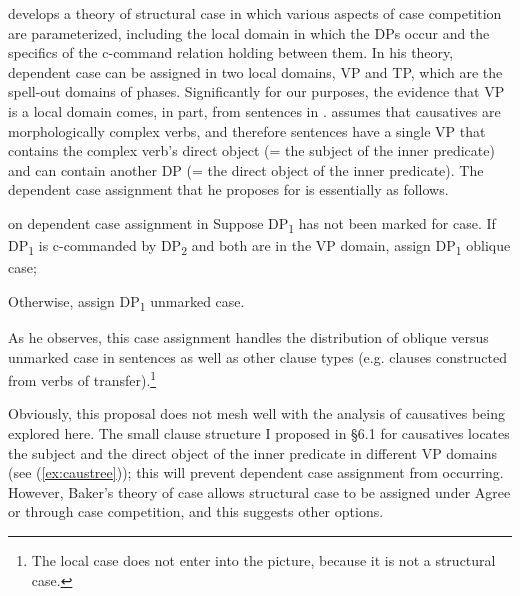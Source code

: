 \documentclass[output=paper,
modfonts
]{LSP/langsci}
\begin{document}
\begin{exe}
\begin{xlist}
\citet{baker2015} develops a theory of structural case in which various
aspects of case competition are parameterized, including the local
domain in which the DPs occur and the specifics of the c-command
relation holding between them. In his theory, dependent case can be
assigned in two local domains, VP and TP, which are the spell-out
domains of phases. Significantly for our purposes, the evidence that VP
is a local domain comes, in part, from  sentences in .
\citet[137--139]{baker2015} assumes that  causatives are
morphologically complex verbs, and therefore  sentences have a
single VP that contains the complex verb's direct object (= the subject
of the inner predicate) and can contain another DP (= the direct object
of the inner predicate). The dependent case assignment that he proposes
for  is essentially as follows.

\ea \label{ex:chung:35} \citet{baker2015} on dependent case assignment in 
\ea \label{ex:chung:35a} 
Suppose DP\textsubscript{1} has not been marked for case. If
DP\textsubscript{1} is c-commanded by DP\textsubscript{2} and both are
in the VP domain, assign DP\textsubscript{1} oblique case;

\ex \label{ex:chung:35b} Otherwise, assign DP\textsubscript{1} unmarked case.
\z
\z

\newpage 
As he observes, this case assignment handles the distribution of oblique
versus unmarked case in  sentences as well as other clause
types (e.g. clauses constructed from verbs of transfer).\footnote{The
  local case does not enter into the picture, because it is not a
  structural case.}

Obviously, this proposal does not mesh well with the analysis of
 causatives being explored here. The small clause structure I
proposed in \S6.1 for causatives locates the subject and the
direct object of the inner predicate in different VP domains (see (\ref{ex:caustree}));
this will prevent dependent case assignment from occurring. However,
Baker's theory of case allows structural case to be assigned under Agree
or through case competition, and this suggests other options.


\end{xlist}
\end{exe}
\end{document}
